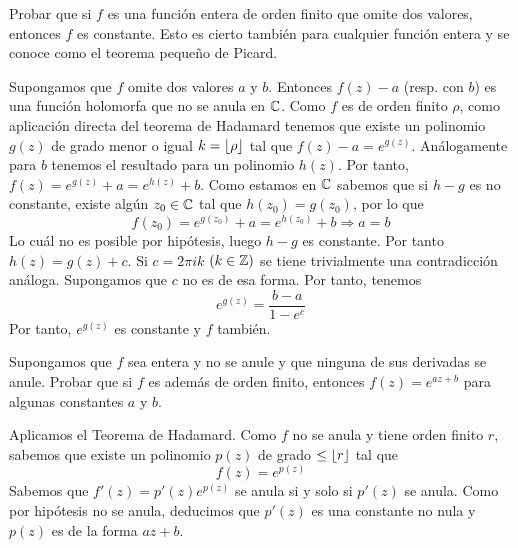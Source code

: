 \documentclass[twoside]{article}
\begin{document}
\newpage

\begin{ejercicio}{4}
Probar que si $f$ es una función entera de orden finito que omite dos valores, entonces $f$ es constante. Esto es cierto también para cualquier función entera y se conoce como el teorema pequeño de Picard.
\end{ejercicio}
\begin{solucion}
Supongamos que $f$ omite dos valores $a$ y $b$. Entonces $f(z)-a$ (resp. con $b$) es una función holomorfa que no se anula en $\mathbb{C}$. Como $f$ es de orden finito $\rho$, como aplicación directa del teorema de Hadamard tenemos que existe un polinomio $g(z)$ de grado menor o igual $k=\left\lfloor{\rho}\right\rfloor$ tal que $f(z)-a=e^{g(z)}$. Análogamente para $b$ tenemos el resultado para un polinomio $h(z)$. Por tanto, $f(z)=e^{g(z)}+a=e^{h(z)}+b$. Como estamos en $\mathbb{C}$ sabemos que si $h-g$ es no constante, existe algún $z_0\in \mathbb{C}$ tal que $h(z_0)=g(z_0)$, por lo que 
$$
f(z_0) = e^{g(z_0)}+a=e^{h(z_0)}+b \Rightarrow a = b
$$
Lo cuál no es posible por hipótesis, luego $h-g$ es constante. Por tanto $h(z)=g(z)+c$. Si $c=2\pi i k$ $(k\in \mathbb{Z})$ se tiene trivialmente una contradicción análoga. Supongamos que $c$ no es de esa forma. Por tanto, tenemos
$$
e^{g(z)}=\frac{b-a}{1-e^c}
$$
Por tanto, $e^{g(z)}$ es constante y $f$ también. 

\end{solucion}

\newpage


\begin{ejercicio}{5}
Supongamos que $f$ sea entera y no se anule y que ninguna de sus derivadas se anule. Probar que si $f$ es además de orden finito, entonces $f(z)=e^{az+b}$ para algunas constantes $a$ y $b$.
\end{ejercicio}
\begin{solucion}
Aplicamos el Teorema de Hadamard. Como $f$ no se anula y tiene orden finito $r$, sabemos que existe un polinomio $p(z)$ de grado $\leq \left\lfloor{r}\right\rfloor$ tal que
$$
f(z)=e^{p(z)}
$$
Sabemos que $f'(z)=p'(z)e^{p(z)}$ se anula si y solo si $p'(z)$ se anula. Como por hipótesis no se anula, deducimos que $p'(z)$ es una constante no nula y $p(z)$ es de la forma $az+b$.
\end{solucion}
\newpage
\end{document}

